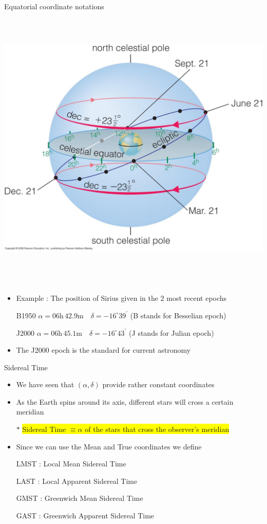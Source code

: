 \Tr
\onecolumn
\begin{center}
{\blue Equatorial coordinate notations}\\[3mm]
\includegraphics[keepaspectratio,height=14cm]{hra-dec}
\end{center}

\Tr
\onecolumn
\begin{itemize}
\item Example : The position of Sirius given in the 2 most recent epochs
\item[] B1950 $\alpha=06\text{h}\,42.9\text{m} \quad \delta=-16^{\circ} 39^{\prime}$ (B stands for Besselian epoch)
\item[] J2000 $\alpha=06\text{h}\,45.1\text{m} \quad \delta=-16^{\circ} 43^{\prime}$ (J stands for Julian epoch)
\item The J2000 epoch is the standard for current astronomy 
\end{itemize}
%
\begin{center}
{\red Sidereal Time}
\end{center}
%
\begin{itemize}
\item We have seen that $(\alpha,\delta)$ provide rather constant coordinates
\item As the Earth spins around its axis, different stars will cross a certain meridian
\item[$\ast$] \colorbox{yellow}{Sidereal Time $\equiv \alpha$ of the stars that cross the observer's meridian}
\item Since we can use the {\blue Mean and True coordinates} we define
\item[] {\red LMST : Local Mean Sidereal Time}
\item[] {\red LAST : Local Apparent Sidereal Time}
\item[] {\red GMST : Greenwich Mean Sidereal Time}
\item[] {\red GAST : Greenwich Apparent Sidereal Time}
\end{itemize}

